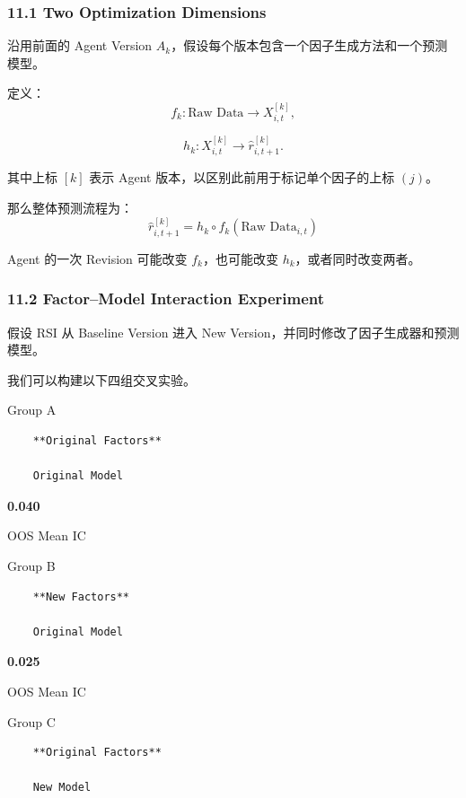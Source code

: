 \hypertarget{part-4-63-0001-two-optimization-dimensions}{%
\subsubsection{11.1 Two Optimization Dimensions}\label{part-4-63-0001-two-optimization-dimensions}}

沿用前面的 Agent Version \(A_k\)，假设每个版本包含一个因子生成方法和一个预测模型。

定义：
\[f_k:\text{Raw Data}\longrightarrow X_{i,t}^{[k]},\]

\[h_k:X_{i,t}^{[k]}
\longrightarrow\hat r_{i,t+1}^{[k]}.\]

其中上标 \([k]\) 表示 Agent 版本，以区别此前用于标记单个因子的上标 \((j)\)。

那么整体预测流程为：
\[\boxed{
\hat r_{i,t+1}^{[k]}
=
h_k\circ f_k(\text{Raw Data}_{i,t})
}\]

Agent 的一次 Revision 可能改变 \(f_k\)，也可能改变 \(h_k\)，或者同时改变两者。

\hypertarget{part-4-63-0001-factormodel-interaction-experiment}{%
\subsubsection{11.2 Factor--Model Interaction Experiment}\label{part-4-63-0001-factormodel-interaction-experiment}}

假设 RSI 从 Baseline Version 进入 New Version，并同时修改了因子生成器和预测模型。

我们可以构建以下四组交叉实验。

Group A

\begin{verbatim}
    **Original Factors**

    Original Model
\end{verbatim}

\textbf{0.040}

OOS Mean IC

Group B

\begin{verbatim}
    **New Factors**

    Original Model
\end{verbatim}

\textbf{0.025}

OOS Mean IC

Group C

\begin{verbatim}
    **Original Factors**

    New Model
\end{verbatim}


